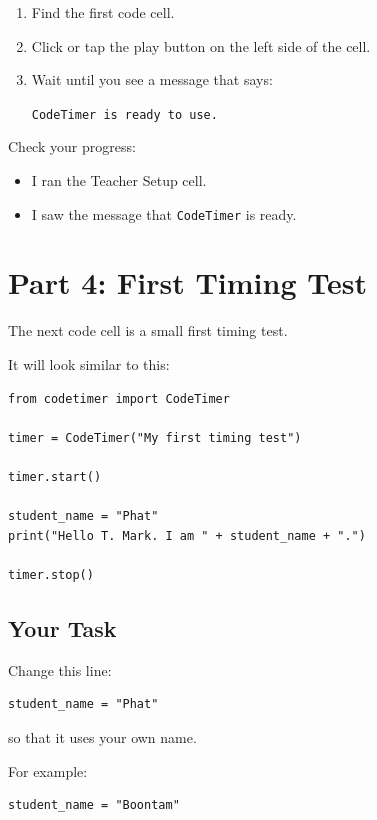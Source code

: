 \documentclass[11pt]{article}
\newcommand{\checkbox}{$\square$}
\begin{document}
\begin{enumerate}
    \item Find the first code cell.
    \item Click or tap the play button on the left side of the cell.
    \item Wait until you see a message that says:

    \begin{center}
    \texttt{CodeTimer is ready to use.}
    \end{center}
\end{enumerate}

\noindent Check your progress:

\begin{itemize}
    \item[\checkbox] I ran the Teacher Setup cell.
    \item[\checkbox] I saw the message that \texttt{CodeTimer} is ready.
\end{itemize}

\section*{Part 4: First Timing Test}

The next code cell is a small first timing test.

It will look similar to this:

\begin{lstlisting}[style=pythonstyle]
from codetimer import CodeTimer

timer = CodeTimer("My first timing test")

timer.start()

student_name = "Phat"
print("Hello T. Mark. I am " + student_name + ".")

timer.stop()
\end{lstlisting}

\subsection*{Your Task}

Change this line:

\begin{lstlisting}[style=pythonstyle]
student_name = "Phat"
\end{lstlisting}

so that it uses your own name.

For example:

\begin{lstlisting}[style=pythonstyle]
student_name = "Boontam"
\end{lstlisting}
\end{document}
